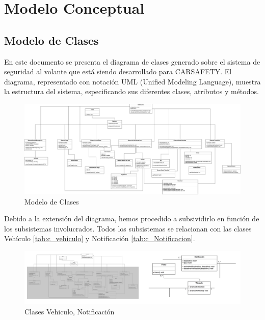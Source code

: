 \chapter{Modelo Conceptual}
\clearpage

\section {Modelo de Clases}
\par En este documento se presenta el diagrama de clases generado sobre el sistema de seguridad al volante que está siendo desarrollado para CARSAFETY. El diagrama, representado con notación UML (Unified Modeling Language), muestra la estructura del sistema, especificando sus diferentes clases, atributos y métodos.


\begin{figure}[H]
\begin{center}
\includegraphics[width=1\textwidth]{./img/m_clases.png}
\end{center}
\caption{Modelo de Clases}
\label{tab:m_clases}
\end{figure}

\par Debido a la extensión del diagrama, hemos procedido a subsividirlo en función de los subsistemas involucrados. Todos los subsistemas se relacionan con las clases Vehículo \ref{tab:c_vehiculo} y Notificación \ref{tab:c_Notificacion}.

\begin{figure}[H]
\begin{center}
\includegraphics[width=1\textwidth]{./img/VehiculoNotificacion.png}
\end{center}
\caption{Clases Vehiculo, Notificación}
\label{tab:c_vehiculo_notificacionPNG}
\end{figure}

